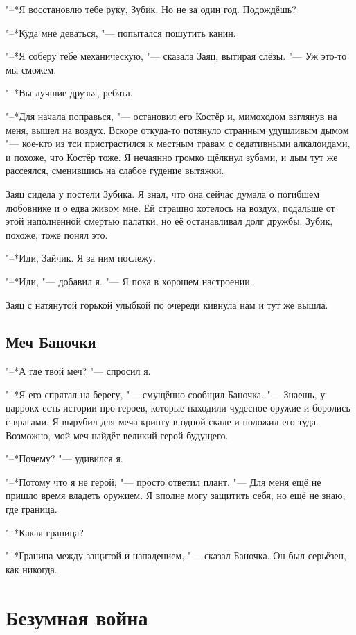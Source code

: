 \documentclass[a4paper,10pt,fleqn]{book}
\begin{document}
"--*Я восстановлю тебе руку, Зубик.
Но не за один год.
Подождёшь?

"--*Куда мне деваться, "--- попытался пошутить канин.

"--*Я соберу тебе механическую, "--- сказала Заяц, вытирая слёзы.
"--- Уж это-то мы сможем.

"--*Вы лучшие друзья, ребята.

"--*Для начала поправься, "--- остановил его Костёр и, мимоходом взглянув на меня, вышел на воздух.
Вскоре откуда-то потянуло странным удушливым дымом "--- кое-кто из тси пристрастился к местным травам с седативными алкалоидами, и похоже, что Костёр тоже.
Я нечаянно громко щёлкнул зубами, и дым тут же рассеялся, сменившись на слабое гудение вытяжки.

Заяц сидела у постели Зубика.
Я знал, что она сейчас думала о погибшем любовнике и о едва живом мне.
Ей страшно хотелось на воздух, подальше от этой наполненной смертью палатки, но её останавливал долг дружбы.
Зубик, похоже, тоже понял это.

"--*Иди, Зайчик.
Я за ним послежу.

"--*Иди, "--- добавил я.
"--- Я пока в хорошем настроении.

Заяц с натянутой горькой улыбкой по очереди кивнула нам и тут же вышла.

\section{Меч Баночки}

"--*А где твой меч? "--- спросил я.

"--*Я его спрятал на берегу, "--- смущённо сообщил Баночка.
"--- Знаешь, у царрокх есть истории про героев, которые находили чудесное оружие и боролись с врагами.
Я вырубил для меча крипту в одной скале и положил его туда.
Возможно, мой меч найдёт великий герой будущего.

"--*Почему? "--- удивился я.

"--*Потому что я не герой, "--- просто ответил плант.
"--- Для меня ещё не пришло время владеть оружием.
Я вполне могу защитить себя, но ещё не знаю, где граница.

"--*Какая граница?

"--*Граница между защитой и нападением, "--- сказал Баночка.
Он был серьёзен, как никогда.

\chapter{Безумная война}
\end{document}
